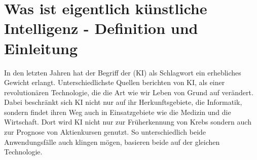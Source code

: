 \documentclass[12pt,german,ngerman]{report}
\begin{document}
    \tableofcontents
    \newpage


\chapter{Was ist eigentlich künstliche Intelligenz - Definition und Einleitung}


    In den letzten Jahren hat der Begriff der  (KI) als Schlagwort ein erhebliches Gewicht
    erlangt. Unterschiedlichste Quellen berichten von KI, als einer revolutionären Technologie, die die
    Art wie wir Leben von Grund auf verändert.
    Dabei beschränkt sich KI nicht nur auf ihr Herkunftsgebiete, die Informatik, sondern findet ihren Weg auch in
    Einsatzgebiete wie die Medizin und die Wirtschaft. Dort wird KI nicht nur zur Früherkennung
    von Krebs sondern auch zur Prognose von Aktienkursen genutzt. So unterschiedlich
    beide Anwendungsfälle auch klingen mögen, basieren beide auf der gleichen Technologie.\\
\end{document}
